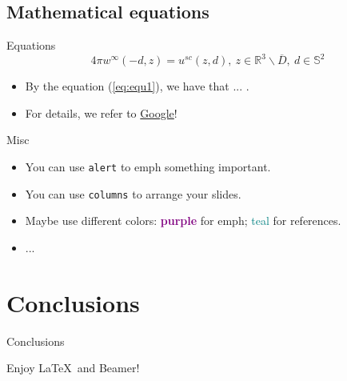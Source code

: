 \documentclass[aspectratio=169]{beamer}
\begin{document}

\subsection{Mathematical equations}

\begin{frame}{Equations}
	\begin{equation} \label{eq:equ1}
		4\pi w^{\infty}\left(-d, z\right) = u^{sc}\left(z, d\right),\ z \in \mathbb{R}^{3}\backslash \overline{D},\ d \in \mathbb{S}^{2}
	\end{equation}	
	
	\begin{itemize}
		\item By the equation (\ref{eq:equ1}), we have that ... .
		\item For details, we refer to \href{www.google.com}{Google}!
	\end{itemize}
\end{frame}

	
\begin{frame}{Misc}
	\begin{itemize}
		\item<1-> You can use \texttt{alert}  to emph \alert{something important}.
		\item<2-> You can use \texttt{columns} to arrange your slides.
		\item<3-> Maybe use different colors: \textbf{\textcolor{purple}{purple}} for 
		emph; \textcolor{teal}{teal} for references.
		\item<4-> ...
	\end{itemize}
	
\end{frame}
	

\section{Conclusions}


\begin{frame}{Conclusions}
	\begin{center}
		Enjoy \LaTeX\ and Beamer!
	\end{center}
\end{frame}
	
\end{document}
